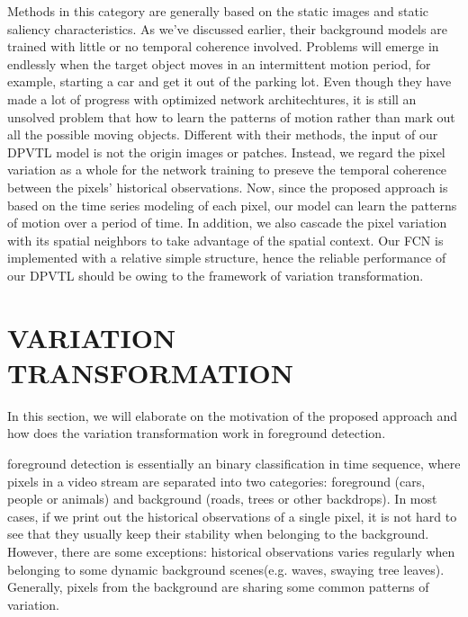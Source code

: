 \documentclass[journal]{IEEEtran}
\begin{document}
Methods in this category are generally based on the static images and static saliency characteristics. 
As we've discussed earlier, their background models are trained with little or no temporal coherence involved.
Problems will emerge in endlessly when the target object moves in an intermittent motion period, for example, starting a car and get it out of the parking lot. 
Even though they have made a lot of progress with optimized network architechtures, it is still an unsolved problem that how to learn the patterns of motion rather than mark out all the possible moving objects.
Different with their methods, the input of our DPVTL model is not the origin images or patches. Instead, we regard the pixel variation as a whole for the network training to preseve the temporal coherence between the pixels' historical observations.
Now, since the proposed approach is based on the time series modeling of each pixel, our model can learn the patterns of motion over a period of time.
In addition, we also cascade the pixel variation with its spatial neighbors to take advantage of the spatial context. 
Our FCN is implemented with a relative simple structure, hence the reliable performance of our DPVTL should be owing to the framework of variation transformation. 


\section{VARIATION TRANSFORMATION}
\label{sec3}
In this section, we will elaborate on the motivation of the proposed approach and how does the variation transformation work in foreground detection.

foreground detection is essentially an binary classification in time sequence, where pixels in a video stream are separated into two categories: foreground (cars, people or animals) and background (roads, trees or other backdrops). 
In most cases, if we print out the historical observations of a single pixel, it is not hard to see that they usually keep their stability when belonging to the background. 
However, there are some exceptions: historical observations varies regularly when belonging to some dynamic background scenes(e.g. 
waves, swaying tree leaves). 
Generally, pixels from the background are sharing some common patterns of variation. 
\end{document}

